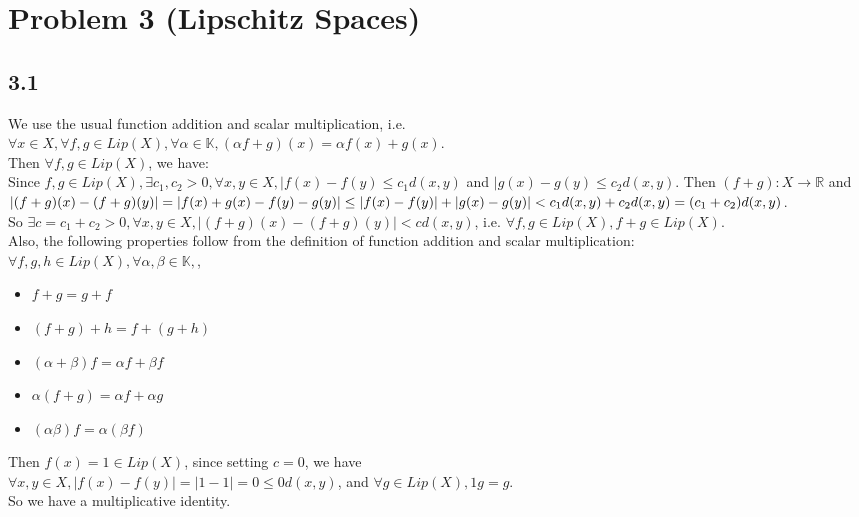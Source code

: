 \documentclass[12pt,a4paper]{article}
\newcommand{\R}{\mathbb{R}}
\newcommand{\K}{\mathbb{K}}
\theoremstyle{plain}
\theoremstyle{remark}
\theoremstyle{definition}
\begin{document}
\pagebreak
\section*{Problem 3 (Lipschitz Spaces)}
\subsection*{3.1}
We use the usual function addition and scalar multiplication, i.e.\\
$\forall x \in X, \forall f,g \in Lip(X), \forall \alpha \in \K, (\alpha f + g)(x) = \alpha f(x) + g(x)$.\\
Then $\forall f,g \in Lip(X)$, we have:\\
Since $f,g \in Lip(X), \exists c_1,c_2 > 0, \forall x,y \in X, \vert f(x) - f(y) \le c_1d(x,y)$ and $\vert g(x) - g(y) \le c_2d(x,y)$. Then $(f+g):X \to \R$ and\\
$\vert (f+g)(x) - (f+g)(y)\vert = \vert f(x) + g(x) - f(y) - g(y) \vert \\
\le \vert f(x) - f(y) \vert + \vert g(x) - g(y) \vert < c_1 d(x,y) + c_2 d(x,y) = (c_1 + c_2) d(x,y)$.\\
So $\exists c = c_1 + c_2 > 0, \forall x,y \in X, \vert(f+g)(x) - (f+g)(y)\vert < cd(x,y)$, i.e.
$\forall f,g \in Lip(X), f+g \in Lip(X)$.\\
Also, the following properties follow from the definition of function addition and scalar multiplication:\\
$\forall f,g,h \in Lip(X), \forall \alpha, \beta \in \K,$,
\begin{itemize}
	\item 
	$f + g = g + f$
	
	\item 
	$(f + g) + h = f + (g + h)$
	
	\item 
	$(\alpha + \beta)f = \alpha f + \beta f$
	
	\item
	$\alpha(f + g) = \alpha f + \alpha g$
	
	\item 
	$(\alpha\beta)f = \alpha(\beta f)$
\end{itemize}

Then $f(x) = 1 \in Lip(X)$, since setting $c = 0$, we have\\
$\forall x,y \in X, \vert f(x) - f(y) \vert = \vert 1 - 1 \vert = 0 \le 0d(x,y)$, and $\forall g \in Lip(X), 1g = g$.\\
So we have a multiplicative identity.
\end{document}
